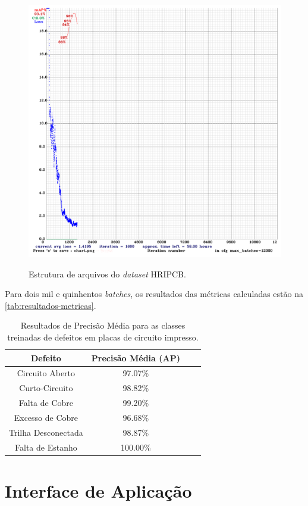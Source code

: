 \begin{figure}[h!] %
  \centering
  \caption{Estrutura de arquivos do \textit{dataset} HRIPCB.}
  \includegraphics[scale=0.8]{img/img-resultados-grafico.png}
  \label{fig:resultados-grafico}
\end{figure}

Para dois mil e quinhentos \textit{batches}, os resultados das métricas calculadas estão na \autoref{tab:resultados-metricas}.

\begin{table}[!h]
  \begin{center}
  \caption{Resultados de Precisão Média para as classes treinadas de defeitos em placas de circuito impresso.}
  \label{tab:resultados-metricas}
  \begin{tabular}{cccc}
    \toprule
    \textbf{Defeito} & \textbf{Precisão Média (AP)} \\
    \midrule \midrule
    Circuito Aberto     & 97.07\% \\
    Curto-Circuito      & 98.82\% \\
    Falta de Cobre      & 99.20\%  \\
    Excesso de Cobre    & 96.68\% \\
    Trilha Desconectada & 98.87\% \\
    Falta de Estanho    & 100.00\% \\
    \bottomrule
  \end{tabular}
  \end{center}
\end{table}

\chapter{Interface de Aplicação} \label{cap:api}
